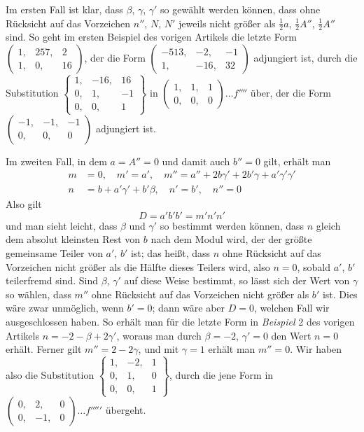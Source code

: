 Im ersten Fall ist klar, dass \(\beta\), \(\gamma\), \(\gamma'\) so gewählt werden können, dass ohne Rücksicht auf das Vorzeichen \(n''\), \(N\), \(N'\) jeweils nicht größer als \(\frac{1}{2}a\), \(\frac{1}{2}A''\), \(\frac{1}{2}A''\) sind. So geht im ersten Beispiel des vorigen Artikels die letzte Form \(\left(\begin{smallmatrix}1,&257,&2\\1,&0,&16\end{smallmatrix}\right)\), der die Form \(\left(\begin{smallmatrix}-513,&-2,&-1\\1,&-16,&32\end{smallmatrix}\right)\) adjungiert ist, durch die Substitution \(\left\{\begin{smallmatrix}1,&-16,&16\\0,&1,&-1\\0,&0,&1\end{smallmatrix}\right\}\) in \(\left(\begin{smallmatrix}1,&1,&1\\0,&0,&0\end{smallmatrix}\right)\ldots f''''\) über, der die Form \(\left(\begin{smallmatrix}-1,&-1,&-1\\0,&0,&0\end{smallmatrix}\right)\) adjungiert ist.

Im zweiten Fall, in dem \(a=A''=0\) und damit auch \(b''=0\) gilt, erhält man
\[
\begin{aligned}
m&=0,\quad m'=a',\quad m''=a''+2b\gamma'+2b'\gamma+a'\gamma'\gamma'\\
n&=b+a'\gamma'+b'\beta,\quad n'=b',\quad n''=0
\end{aligned}
\]
Also gilt
\[
D=a'b'b'=m'n'n'
\]
und man sieht leicht, dass \(\beta\) und \(\gamma'\) so bestimmt werden können, dass \(n\) gleich dem absolut kleinsten Rest von \(b\) nach dem Modul wird, der der größte gemeinsame Teiler
von \(a'\), \(b'\) ist; das heißt, dass \(n\) ohne Rücksicht auf das Vorzeichen nicht größer als die Hälfte dieses Teilers wird, also \(n=0\), sobald \(a'\), \(b'\) teilerfremd sind. Sind \(\beta\), \(\gamma'\) auf diese Weise bestimmt, so lässt sich der Wert von \(\gamma\) so wählen, dass \(m''\) ohne Rücksicht auf das Vorzeichen nicht größer als \(b'\) ist. Dies wäre zwar unmöglich, wenn \(b'=0\); dann wäre aber \(D=0\), welchen Fall wir ausgeschlossen haben. So erhält man für die letzte Form in \emph{Beispiel} 2 des vorigen Artikels \(n=-2-\beta+2\gamma'\), woraus man durch \(\beta=-2\), \(\gamma'=0\) den Wert \(n=0\) erhält. Ferner gilt \(m''=2-2\gamma\), und mit \(\gamma=1\) erhält man \(m''=0\). Wir haben also die Substitution \(\left\{\begin{smallmatrix}1,&-2,&1\\0,&1,&0\\0,&0,&1\end{smallmatrix}\right\}\), durch die jene Form in \(\left(\begin{smallmatrix}0,&2,&0\\0,&-1,&0\end{smallmatrix}\right)\ldots f'''''\) übergeht.

